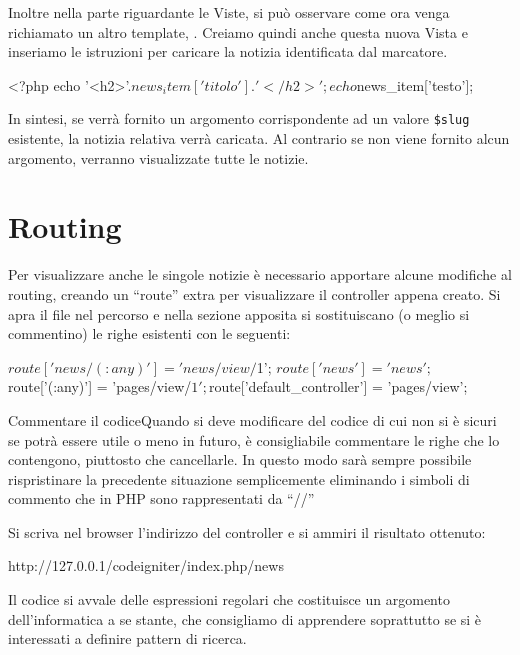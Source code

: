 Inoltre nella parte riguardante le Viste, si può osservare come ora venga richiamato un altro template, . Creiamo quindi anche questa nuova Vista  e inseriamo le istruzioni per caricare la notizia identificata dal marcatore.

\begin{code}
<?php
echo '<h2>'.$news_item['titolo'].'</h2>';
echo $news_item['testo'];
\end{code}

In sintesi, se verrà fornito un argomento corrispondente ad un valore \verb|$slug| esistente, la notizia relativa verrà caricata. Al contrario se non viene fornito alcun argomento, verranno visualizzate tutte le notizie.

\section*{Routing}
Per visualizzare anche le singole notizie è necessario apportare alcune modifiche al routing, creando un ``route'' extra per visualizzare il controller appena creato. Si apra il file  nel percorso  e nella sezione apposita si sostituiscano (o meglio si commentino) le righe esistenti con le seguenti:

\begin{code}
$route['news/(:any)'] = 'news/view/$1';
$route['news'] = 'news';
$route['(:any)'] = 'pages/view/$1';
$route['default_controller'] = 'pages/view';
\end{code}

\begin{deftab}{Commentare il codice}{Quando si deve modificare del codice di cui non si è sicuri se potrà essere utile o meno in futuro, è consigliabile commentare le righe che lo contengono, piuttosto che cancellarle. In questo modo sarà sempre possibile rispristinare la precedente situazione semplicemente eliminando i simboli di commento che in \ac{PHP} sono rappresentati da ``//''}
\end{deftab}

Si scriva nel browser l'indirizzo del controller e si ammiri il risultato ottenuto:

\begin{code}
http://127.0.0.1/codeigniter/index.php/news
\end{code}

Il codice si avvale delle espressioni regolari che costituisce un argomento dell'informatica a se stante, che consigliamo di apprendere soprattutto se si è interessati a definire pattern di ricerca.

